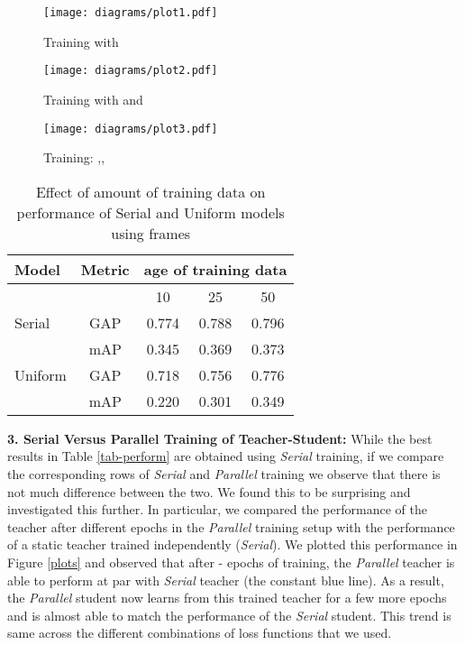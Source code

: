 \documentclass[10pt,twocolumn,letterpaper]{article}
\begin{document}
\begin{figure*}[t]
    \begin{subfigure}[b]{0.33\textwidth}
        \texttt{[image: diagrams/plot1.pdf]}
        \caption{Training with }
        \label{plot1}
    \end{subfigure} \begin{subfigure}[b]{0.33\textwidth}
      \texttt{[image: diagrams/plot2.pdf]}
      \caption{Training with  and }
      \label{plot2}
    \end{subfigure} \begin{subfigure}[b]{0.33\textwidth}
      \texttt{[image: diagrams/plot3.pdf]}
      \caption{Training: ,,}
      \label{plot3}
    \end{subfigure}
    \caption{Performance comparison (\textsc{GAP} score) of different variants of \textit{Serial} and \textit{Parallel} methods in \textit{Teacher}-\textit{Student} training.}\label{plots}
\end{figure*}
\begin{table}[t]
\centering
\begin{tabular}{l|c|ccc}
\toprule
Model & Metric & \multicolumn{3}{c}{age of training data} \\
\toprule
 & \multicolumn{1}{|l|}{} & 10 & 25 & 50 \\ 
 \toprule
Serial & GAP & 0.774 & 0.788 & 0.796 \\ 
 & mAP & 0.345 & 0.369 & 0.373 \\ 
 \midrule
Uniform & GAP & 0.718 & 0.756 & 0.776 \\ 
 & mAP & 0.220 & 0.301 & 0.349 \\ 
 \bottomrule
\end{tabular}
\caption{Effect of amount of training data on performance of Serial and Uniform models using  frames}
\label{tab-data}
\end{table}
\noindent\textbf{3. Serial Versus Parallel Training of Teacher-Student:} While the best results in Table \ref{tab-perform} are obtained using \textit{Serial} training, if we compare the corresponding rows of \textit{Serial} and \textit{Parallel} training we observe that there is not much difference between the two. We found this to be surprising and investigated this further. In particular, we compared the performance of the teacher after different epochs in the \textit{Parallel} training setup with the performance of a static teacher trained independently (\textit{Serial}). We plotted this performance in Figure \ref{plots} and observed that after - epochs of training, the \textit{Parallel} teacher is able to perform at par with \textit{Serial} teacher (the constant blue line). As a result, the \textit{Parallel} student now learns from this trained teacher for a few more epochs and is almost able to match the performance of the \textit{Serial} student. This trend is same across the different combinations of loss functions that we used.
\end{document}
